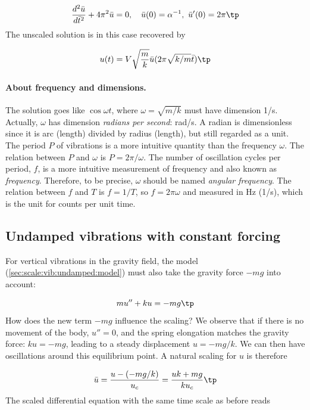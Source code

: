 \documentclass[graybox,envcountchap,sectrefs,final]{svmonodo}
\begin{document}
\begin{equation}
\frac{d^2\bar u}{d\bar t^2} + 4\pi^2 \bar u = 0,
\quad \bar u(0)=\alpha^{-1},\ \bar u'(0)=2\pi\tp
\label{sec:scale:vib:undamped:model:scaled2}
\end{equation}
The unscaled solution is in this case recovered by

\begin{equation}
u(t) = V\sqrt{\frac{m}{k}}\bar u(2\pi\sqrt{k/m}\bar t)\tp
\end{equation}


\paragraph{About frequency and dimensions.}
The solution goes like $\cos\omega t$, where $\omega =\sqrt{m/k}$
must have dimension 1/s. Actually, $\omega$ has dimension \emph{radians
per second}: rad/s. A radian is dimensionless since it is arc (length)
divided by radius (length), but still regarded as a unit.
The period $P$ of vibrations is a more intuitive quantity than the frequency
$\omega$. The relation between $P$ and $\omega$ is $P=2\pi/\omega$.
The number of oscillation cycles per period, $f$, is a more intuitive
measurement of frequency and also known as \emph{frequency}. Therefore, to be
precise, $\omega$ should be named \emph{angular frequency}. The relation between
$f$ and $T$ is $f=1/T$, so $f=2\pi\omega$ and measured in Hz (1/s), which is
the unit for counts per unit time.

\subsection{Undamped vibrations with constant forcing}
\label{sec:scale:vib:undamped:mg}

For vertical vibrations in the gravity field, the model
(\ref{sec:scale:vib:undamped:model}) must also take the gravity force
$-mg$ into account:

\[ mu'' + ku = -mg\tp\]
How does the new term $-mg$ influence
the scaling? We observe that if there is no movement of the body,
$u''=0$, and the spring elongation matches the gravity force:
$ku = -mg$, leading to a steady displacement $u=-mg/k$. We can then
have oscillations around this equilibrium point. A natural scaling
for $u$ is therefore

\[ \bar u = \frac{u - (-mg/k)}{u_c}=\frac{uk + mg}{ku_c}\tp\]
The scaled differential equation with the same time scale as before
reads
\end{document}
